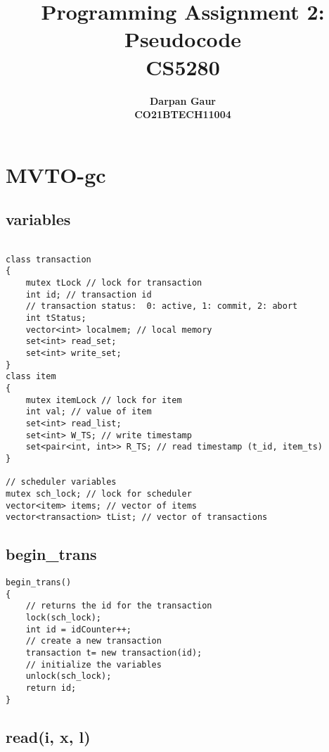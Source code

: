 \documentclass[12pt]{article}
\title{
    \textbf{Programming Assignment 2: Pseudocode} \\ 
    \textbf{CS5280} \\
}
\author{
    \textbf{Darpan Gaur} \\
    \textbf{CO21BTECH11004}
}
\date{}
\begin{document}
\maketitle

\hrulefill

\section*{MVTO-gc}

\subsection*{variables}
\begin{lstlisting}

class transaction
{
    mutex tLock // lock for transaction
    int id; // transaction id
    // transaction status:  0: active, 1: commit, 2: abort
    int tStatus; 
    vector<int> localmem; // local memory
    set<int> read_set;
    set<int> write_set;
}
class item
{
    mutex itemLock // lock for item
    int val; // value of item
    set<int> read_list;
    set<int> W_TS; // write timestamp
    set<pair<int, int>> R_TS; // read timestamp (t_id, item_ts)
}

// scheduler variables
mutex sch_lock; // lock for scheduler
vector<item> items; // vector of items
vector<transaction> tList; // vector of transactions

\end{lstlisting}

\subsection*{begin\_trans}

\begin{lstlisting}
begin_trans()
{
    // returns the id for the transaction
    lock(sch_lock);
    int id = idCounter++;
    // create a new transaction
    transaction t= new transaction(id);
    // initialize the variables
    unlock(sch_lock);
    return id;
}
\end{lstlisting}

\subsection*{read(i, x, l)}
\end{document}
